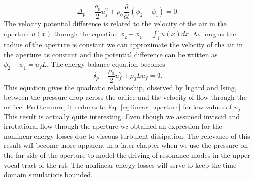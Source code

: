 \documentclass[12pt, letter]{report}
\begin{document}
\begin{equation}  
\Delta_p - \frac{\rho_0}{2} u_f^2 + \rho_0 \frac{\partial }{\partial t}\left( \phi_2 - \phi_1  \right) = 0.
\end{equation}
The velocity potential difference is related to the velocity of the air in the aperture $u(x)$ through the equation $\phi_2 - \phi_1 = \int_1^2 u(x) dx$. As long as the radius of the aperture is constant we can approximate the velocity of the air in the aperture as constant and the potential difference can be written as $\phi_2 - \phi_1 = u_f L$. The energy balance equation becomes 
\begin{equation}  
\label{eq:nonlinear_aperture}
\delta_p - \frac{\rho_0}{2} u_f^2 + \rho_0 L \dot{u}_f = 0.
\end{equation}
This equation gives the quadratic relationship, observed by Ingard and Ising, between the pressure drop across the orifice and the velocity of flow through the orifice. Furthermore, it reduces to Eq. \ref{eq:linear_aperture} for low values of $u_f$. This result is actually quite interesting. Even though we assumed inviscid and irrotational flow through the aperture we obtained an expression for the nonlinear energy losses due to viscous turbulent dissipation. The relevance of this result will become more apparent in a later chapter when we use the pressure on the far side of the aperture to model the driving of resonance modes in the upper vocal tract of the rat. The nonlinear energy losses will serve to keep the time domain simulations bounded.  


\end{document}
